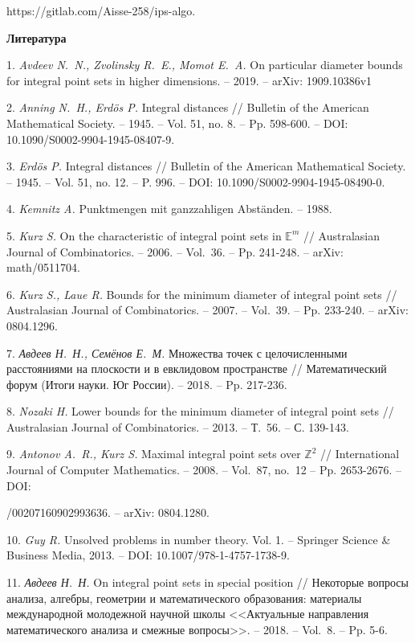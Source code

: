 \documentclass[12pt]{article}
\begin{document}
https://gitlab.com/Aisse-258/ips-algo.

\bigskip\centerline{\bf Литература}

1.  \emph{ Avdeev N.~N., Zvolinsky R.~E., Momot E.~A.} On particular diameter bounds
for integral point sets in higher dimensions. -- 2019. -- arXiv: 1909.10386v1

2.	\emph{ Anning N.~H., Erd{\"o}s P.} Integral distances // Bulletin of the American Mathematical Society. -- 1945. -- Vol. 51, no. 8. -- Pp. 598-600. -- DOI: 10.1090/S0002-9904-1945-08407-9.

3.	\emph{ Erd{\"o}s P.} Integral distances // Bulletin of the American Mathematical Society. -- 1945. -- Vol. 51, no. 12. -- P. 996. -- DOI: 10.1090/S0002-9904-1945-08490-0.

4.  \emph{ Kemnitz A.} Punktmengen mit ganzzahligen Abst{\"a}nden. -- 1988.

5.  \emph{ Kurz S.} On the characteristic of integral point sets in $\mathbb{E}^m$ // Australasian Journal of Combinatorics. -- 2006. -- Vol.~36. -- Pp. 241-248. --
arXiv: math/0511704.

6.  \emph{ Kurz S., Laue R.} Bounds for the minimum diameter of integral point sets
// Australasian Journal of Combinatorics. -- 2007. -- Vol.~39. -- Pp. 233-240. --
arXiv: 0804.1296.

7.  \emph{ Авдеев Н.~Н., Семёнов Е.~М.} Множества точек с целочисленными расстояниями на плоскости и в евклидовом пространстве // Математический форум
(Итоги науки. Юг России). -- 2018. -- Pp. 217-236.

8.  \emph{ Nozaki H.} Lower bounds for the minimum diameter of integral point sets
// Australasian Journal of Combinatorics. -- 2013. -- Т.~56. -- С. 139-143.

9.  \emph{ Antonov A.~R., Kurz S.} Maximal integral point sets over
$\mathbb{Z}^{2}$ // International Journal of Computer Mathematics. -- 2008. --
Vol.~87, no.~12 -- Pp. 2653-2676. -- DOI:

/00207160902993636. -- arXiv: 0804.1280.

10.  \emph{ Guy R.} Unsolved problems in number theory. Vol. 1. -- Springer Science \& Business Media, 2013. -- DOI: 10.1007/978-1-4757-1738-9.

11.  \emph{ Авдеев Н.~Н.} On integral point sets in special position // Некоторые вопросы анализа, алгебры, геометрии и математического образования: материалы международной молодежной научной школы <<Актуальные направления математического анализа и смежные вопросы>>. -- 2018. -- Vol.~8. -- Pp. 5-6.
\end{document}

